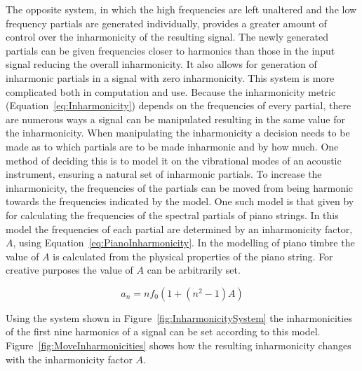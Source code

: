		The opposite system, in which the high frequencies are left unaltered and the low frequency partials are
		generated individually, provides a greater amount of control over the inharmonicity of the resulting
		signal. The newly generated partials can be given frequencies closer to harmonics than those in the input
		signal reducing the overall inharmonicity. It also allows for generation of inharmonic partials in a signal
		with zero inharmonicity. This system is more complicated both in computation and use. Because the
		inharmonicity metric (Equation~\ref{eq:Inharmonicity}) depends on the frequencies of every partial, there
		are numerous ways a signal can be manipulated resulting in the same value for the inharmonicity. When
		manipulating the inharmonicity a decision needs to be made as to which partials are to be made inharmonic
		and by how much. One method of deciding this is to model it on the vibrational modes of an acoustic
		instrument, ensuring a natural set of inharmonic partials. To increase the inharmonicity, the frequencies
		of the partials can be moved from being harmonic towards the frequencies indicated by the model. One such
		model is that given by \citet{rossing2002the} for calculating the frequencies of the spectral partials of
		piano strings. In this model the frequencies of each partial are determined by an inharmonicity factor,
		$A$, using Equation~\ref{eq:PianoInharmonicity}. In the modelling of piano timbre the value of $A$ is
		calculated from the physical properties of the piano string. For creative purposes the value of $A$ can be
		arbitrarily set.

		\begin{equation}
			a_{n} = nf_{0} \left( 1 + \left( n^{2} - 1 \right) A \right)
			\label{eq:PianoInharmonicity}
		\end{equation}

		Using the system shown in Figure~\ref{fig:InharmonicitySystem} the inharmonicities of the first nine
		harmonics of a signal can be set according to this model. Figure~\ref{fig:MoveInharmonicities} shows how
		the resulting inharmonicity changes with the inharmonicity factor $A$.

